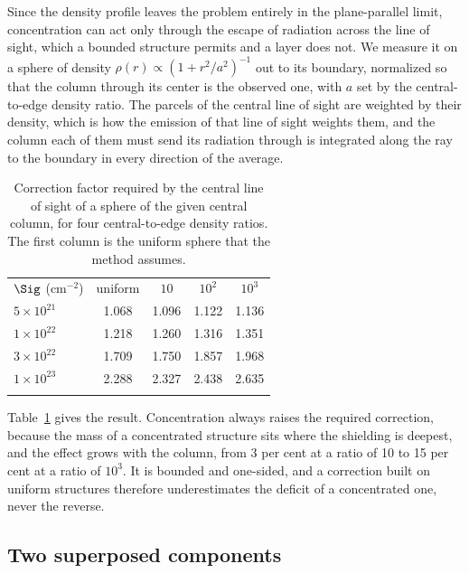 Since the density profile leaves the problem entirely in the plane-parallel limit, concentration can act only through the escape
of radiation across the line of sight, which a bounded structure permits and a layer does not. We measure it on a sphere of
density $\rho(r) \propto (1 + r^2/a^2)^{-1}$ out to its boundary, normalized so that the column through its center is the observed
one, with $a$ set by the central-to-edge density ratio. The parcels of the central line of sight are weighted by their density,
which is how the emission of that line of sight weights them, and the column each of them must send its radiation through is
integrated along the ray to the boundary in every direction of the average.

\begin{table}
\caption{Correction factor required by the central line of sight of a sphere of the given central column, for four
central-to-edge density ratios. The first column is the uniform sphere that the method assumes.}
\label{tab:concentr}
\centering
\begin{tabular}{lcccc}
\hline\hline
\noalign{\smallskip}
$\Sig$ (cm$^{-2}$) & uniform & $10$ & $10^2$ & $10^3$ \\
\noalign{\smallskip}
\hline
\noalign{\smallskip}
$5{\times}10^{21}$ & 1.068 & 1.096 & 1.122 & 1.136 \\
$1{\times}10^{22}$ & 1.218 & 1.260 & 1.316 & 1.351 \\
$3{\times}10^{22}$ & 1.709 & 1.750 & 1.857 & 1.968 \\
$1{\times}10^{23}$ & 2.288 & 2.327 & 2.438 & 2.635 \\
\noalign{\smallskip}
\hline
\end{tabular}
\end{table}

Table~\ref{tab:concentr} gives the result. Concentration always raises the required correction, because the mass of a
concentrated structure sits where the shielding is deepest, and the effect grows with the column, from 3 per cent at a ratio of 10
to 15 per cent at a ratio of $10^3$. It is bounded and one-sided, and a correction built on uniform structures therefore
underestimates the deficit of a concentrated one, never the reverse.

\subsection{Two superposed components}

